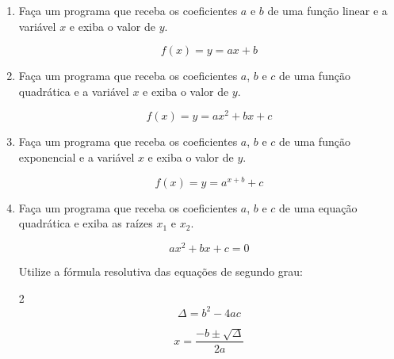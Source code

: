 \begin{enumerate}
	\begin{equation*}
		A = \sqrt{p(p-a)(p-b)(p-c)}
	\end{equation*}	
	
	Onde $p$ é o semiperímetro:
	
	\begin{equation*}
		p = \frac{a+b+c}{2}
	\end{equation*}
	
\quebra	
	
	\item Faça um programa que receba os coeficientes $a$ e $b$ de uma função linear e a variável $x$ e exiba o valor de $y$.
	
	\begin{equation*}
		f(x)  = y = ax + b
	\end{equation*}
	
	\item Faça um programa que receba os coeficientes $a$, $b$ e $c$ de uma função quadrática e a variável $x$ e exiba o valor de $y$.
	
	\begin{equation*}
		f(x)  = y = ax^2 + bx + c
 	\end{equation*}
	
	\item Faça um programa que receba os coeficientes $a$, $b$ e $c$ de uma função exponencial e a variável $x$ e exiba o valor de $y$.
	
	\begin{equation*}
		f(x)  = y = a^{x + b} + c
	\end{equation*}		
	
	\item Faça um programa que receba os coeficientes $a$, $b$ e $c$ de uma equação quadrática e exiba as raízes $x_1$ e $x_2$.
	
	\begin{equation*}
		ax^2 + bx + c = 0
	\end{equation*}
	
	Utilize a fórmula resolutiva das equações de segundo grau:
	
	
	\begin{multicols}{2}
		\begin{equation*}
			\Delta = b^2 - 4ac
		\end{equation*} 		
		
		\begin{equation*}
			x = \frac{-b \pm \sqrt{\Delta}}{2a}
		\end{equation*}
	\end{multicols}
	

\end{enumerate}
